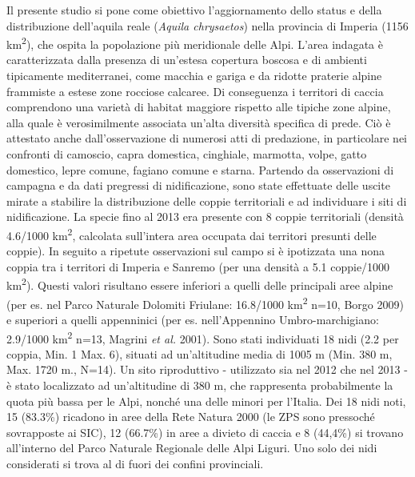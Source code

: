 Il presente studio si pone come obiettivo
l{\textquoteright}aggiornamento dello status e della distribuzione
dell{\textquoteright}aquila reale (\textit{Aquila chrysaetos}) nella
provincia di Imperia (1156 km\textsuperscript{2}), che ospita la
popolazione pi\`u meridionale delle Alpi. L{\textquoteright}area
indagata \`e caratterizzata dalla presenza di un{\textquoteright}estesa
copertura boscosa e di ambienti tipicamente mediterranei, come macchia
e gariga e da ridotte praterie alpine frammiste a estese zone rocciose
calcaree. Di conseguenza i territori di caccia comprendono una
variet\`a di habitat maggiore rispetto alle tipiche zone alpine, alla
quale \`e verosimilmente associata un{\textquoteright}alta diversit\`a
specifica di prede. Ci\`o \`e attestato anche
dall{\textquoteright}osservazione di numerosi atti di predazione, in
particolare nei confronti di camoscio, capra domestica, cinghiale,
marmotta, volpe, gatto domestico, lepre comune, fagiano comune e
starna.
Partendo da osservazioni di campagna e da dati pregressi di
nidificazione, sono state effettuate delle uscite mirate a stabilire la
distribuzione delle coppie territoriali e ad individuare i siti di
nidificazione.
La specie fino al 2013 era presente con 8 coppie territoriali (densit\`a
4.6/1000 km\textsuperscript{2}, calcolata sull{\textquoteright}intera
area occupata dai territori presunti delle coppie). In seguito a
ripetute osservazioni sul campo si \`e ipotizzata una nona coppia tra i
territori di Imperia e Sanremo (per una densit\`a a 5.1 coppie/1000
km\textsuperscript{2}). Questi valori risultano essere inferiori a
quelli delle principali aree alpine (per es. nel Parco Naturale
Dolomiti Friulane: 16.8/1000 km\textsuperscript{2}
n=10,\textsuperscript{ } Borgo\textsc{ 2009}) e superiori a quelli
appenninici (per es. nell{\textquoteright}Appennino Umbro-marchigiano:
2.9/1000 km\textsuperscript{2} n=13, Magrini \textit{et al. }2001).
Sono stati individuati 18 nidi (2.2 per coppia, Min. 1 Max. 6), situati
ad un{\textquoteright}altitudine media di 1005 m (Min. 380 m, Max. 1720
m., N=14). Un sito riproduttivo - utilizzato sia nel 2012 che nel 2013
- \`e stato localizzato ad un{\textquoteright}altitudine di 380 m, che
rappresenta probabilmente la quota pi\`u bassa per le Alpi, nonch\'e
una delle minori per l{\textquoteright}Italia.
Dei 18 nidi noti, 15 (83.3\%) ricadono in aree della Rete Natura 2000
(le ZPS sono pressoch\'e sovrapposte ai SIC), 12 (66.7\%) in aree a
divieto di caccia e 8 (44,4\%) si trovano all{\textquoteright}interno
del Parco Naturale Regionale delle Alpi Liguri. Uno solo dei nidi
considerati si trova al di fuori dei confini provinciali.

